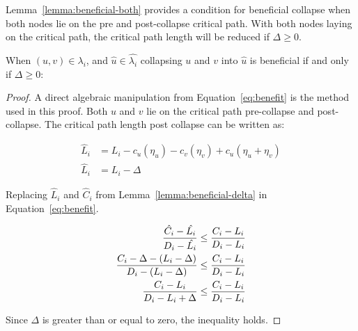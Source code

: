 Lemma~\ref{lemma:beneficial-both} provides a condition for beneficial
collapse when both nodes lie on the pre and post-collapse critical
path. With both nodes laying on the critical path, the critical path
length will be reduced if ${\Delta \ge 0}$.

\begin{lemma}\label{lemma:beneficial-both}
  When ${(u,v) \in \lambda_i}$, and ${\hat{u} \in \hat{\lambda_i}}$
  collapsing ${u}$ and ${v}$ into ${\hat{u}}$ is beneficial if and
  only if ${\Delta \ge 0}$:

  \begin{proof}
    A direct algebraic manipulation from Equation~\ref{eq:benefit} is
    the method used in this proof. Both ${u}$ and ${v}$ lie on the
    critical path pre-collapse and post-collapse. The critical path
    length post collapse can be written as:

    \begin{align*}
      \hat{L}_i &= L_i - c_u(\eta_u) - c_v(\eta_v) + c_u(\eta_u +  \eta_v) \\
      \hat{L}_i &= L_i - \Delta
    \end{align*}

    Replacing ${\hat{L}_i}$ and ${\hat{C}_i}$ from
    Lemma~\ref{lemma:beneficial-delta} in Equation~\ref{eq:benefit}.

    \begin{align*}
      \indent
      \frac{\hat{C_i} - \hat{L_i}} 
           {D_i - \hat{L_i}}
           &\le
      \frac{C_i - L_i} 
           {D_i - L_i} \\
      \frac{C_i - \Delta - (L_i - \Delta)}
           {D_i - (L_i - \Delta)}
           &\le
      \frac{C_i - L_i} 
           {D_i - L_i} \\
      \frac{C_i - L_i}
           {D_i - L_i + \Delta}
           &\le
      \frac{C_i - L_i} 
           {D_i - L_i}
      \end{align*}

    Since ${\Delta}$ is greater than or equal to zero, the inequality
    holds.     
  \end{proof}
\end{lemma}
